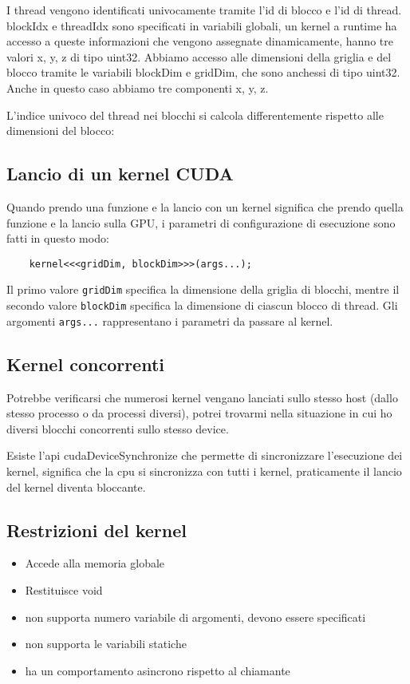 I thread vengono identificati univocamente tramite l'id di blocco e l'id di thread. blockIdx e threadIdx sono specificati in variabili globali, un kernel a runtime ha accesso a queste informazioni che vengono assegnate dinamicamente, hanno tre valori x, y, z di tipo uint32.
Abbiamo accesso alle dimensioni della griglia e del blocco tramite le variabili blockDim e gridDim, che sono anchessi di tipo uint32. Anche in questo caso abbiamo tre componenti x, y, z.

L'indice univoco del thread nei blocchi si calcola differentemente rispetto alle dimensioni del blocco:

\subsection{Lancio di un kernel CUDA}
Quando prendo una funzione e la lancio con un kernel significa che prendo quella funzione e la lancio sulla GPU, i parametri di configurazione di esecuzione sono fatti in questo modo:
\begin{lstlisting}
    kernel<<<gridDim, blockDim>>>(args...);
\end{lstlisting}
Il primo valore \texttt{gridDim} specifica la dimensione della griglia di blocchi, mentre il secondo valore \texttt{blockDim} specifica la dimensione di ciascun blocco di thread. Gli argomenti \texttt{args...} rappresentano i parametri da passare al kernel.

\subsection{Kernel concorrenti}
Potrebbe verificarsi che numerosi kernel vengano lanciati sullo stesso host (dallo stesso processo o da processi diversi), potrei trovarmi nella situazione in cui ho diversi blocchi concorrenti sullo stesso device.

Esiste l'api cudaDeviceSynchronize che permette di sincronizzare l'esecuzione dei kernel, significa che la cpu si sincronizza con tutti i kernel, praticamente il lancio del kernel diventa bloccante.

\subsection{Restrizioni del kernel}
\begin{itemize}
    \item Accede alla memoria globale
    \item Restituisce void
    \item non supporta numero variabile di argomenti, devono essere specificati
    \item non supporta le variabili statiche
    \item ha un comportamento asincrono rispetto al chiamante
\end{itemize}

